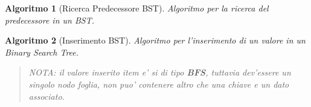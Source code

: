 \documentclass[oneside]{book}
\newtheorem{alg}{Algoritmo}
\begin{document}
\begin{alg}[Ricerca Predecessore BST]
  Algoritmo per la ricerca del predecessore in un BST.

  \begin{algorithm}[H]

  \end{algorithm}
\end{alg}

\begin{alg}[Inserimento BST]
  Algoritmo per l'inserimento di un valore in un Binary Search Tree.

  \begin{algorithm}[H]

  \end{algorithm}
  \begin{quote}
    \normalfont
    NOTA: il valore inserito \emph{item} e' si di tipo \textbf{BFS}, tuttavia dev'essere
    un singolo nodo foglia, non puo' contenere altro che una chiave e un dato associato.
  \end{quote}
\end{alg}

\pagebreak

\end{document}
